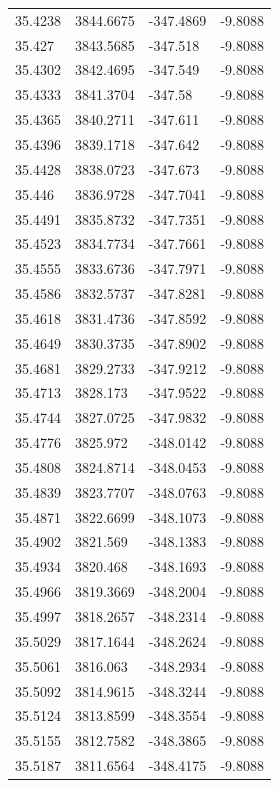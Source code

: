 \begin{table}[H]
\begin{tabular}{llll}
35.4238 & 3844.6675 & -347.4869 & -9.8088 \\
35.427 & 3843.5685 & -347.518 & -9.8088 \\
35.4302 & 3842.4695 & -347.549 & -9.8088 \\
35.4333 & 3841.3704 & -347.58 & -9.8088 \\
35.4365 & 3840.2711 & -347.611 & -9.8088 \\
35.4396 & 3839.1718 & -347.642 & -9.8088 \\
35.4428 & 3838.0723 & -347.673 & -9.8088 \\
35.446 & 3836.9728 & -347.7041 & -9.8088 \\
35.4491 & 3835.8732 & -347.7351 & -9.8088 \\
35.4523 & 3834.7734 & -347.7661 & -9.8088 \\
35.4555 & 3833.6736 & -347.7971 & -9.8088 \\
35.4586 & 3832.5737 & -347.8281 & -9.8088 \\
35.4618 & 3831.4736 & -347.8592 & -9.8088 \\
35.4649 & 3830.3735 & -347.8902 & -9.8088 \\
35.4681 & 3829.2733 & -347.9212 & -9.8088 \\
35.4713 & 3828.173 & -347.9522 & -9.8088 \\
35.4744 & 3827.0725 & -347.9832 & -9.8088 \\
35.4776 & 3825.972 & -348.0142 & -9.8088 \\
35.4808 & 3824.8714 & -348.0453 & -9.8088 \\
35.4839 & 3823.7707 & -348.0763 & -9.8088 \\
35.4871 & 3822.6699 & -348.1073 & -9.8088 \\
35.4902 & 3821.569 & -348.1383 & -9.8088 \\
35.4934 & 3820.468 & -348.1693 & -9.8088 \\
35.4966 & 3819.3669 & -348.2004 & -9.8088 \\
35.4997 & 3818.2657 & -348.2314 & -9.8088 \\
35.5029 & 3817.1644 & -348.2624 & -9.8088 \\
35.5061 & 3816.063 & -348.2934 & -9.8088 \\
35.5092 & 3814.9615 & -348.3244 & -9.8088 \\
35.5124 & 3813.8599 & -348.3554 & -9.8088 \\
35.5155 & 3812.7582 & -348.3865 & -9.8088 \\
35.5187 & 3811.6564 & -348.4175 & -9.8088 \\

\end{tabular}
\end{table}
